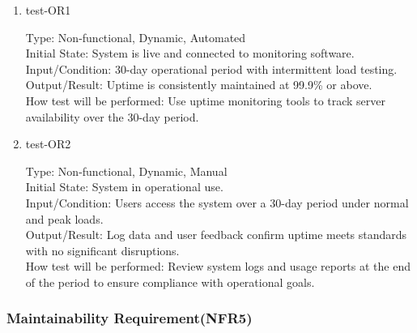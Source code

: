\documentclass[12pt, titlepage]{article}
\begin{document}
\begin{enumerate}
    \item{test-OR1\\} \label{test-OR1}
    
    Type: Non-functional, Dynamic, Automated\\
    
    Initial State: System is live and connected to monitoring software.\\
    
    Input/Condition: 30-day operational period with intermittent load testing.\\
    
    Output/Result: Uptime is consistently maintained at 99.9\% or above.\\
    
    How test will be performed: Use uptime monitoring tools to track server availability over the 30-day period.

    \item{test-OR2\\} \label{test-OR2}
    
    Type: Non-functional, Dynamic, Manual\\
    
    Initial State: System in operational use.\\
    
    Input/Condition: Users access the system over a 30-day period under normal and peak loads.\\
    
    Output/Result: Log data and user feedback confirm uptime meets standards with no significant disruptions.\\
    
    How test will be performed: Review system logs and usage reports at the end of the period to ensure compliance with operational goals.
\end{enumerate}

\subsubsection{Maintainability Requirement(NFR5)} \label{section:4.2.5}
\end{document}

